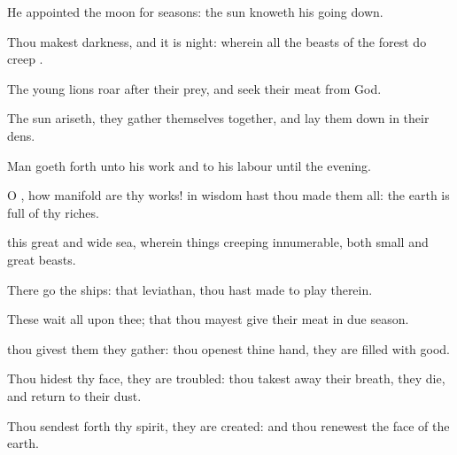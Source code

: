 {\Q {}He
appointed the
moon for
seasons: the
sun
knoweth his going
down.


\par }{\Q {}Thou
makest
darkness, and it is
night: wherein all the
beasts of the
forest do
creep
{}.


\par }{\Q {}The young
lions
roar after their
prey, and
seek their
meat from
God.


\par }{\Q {}The
sun
ariseth, they gather themselves
together, and lay them
down in their
dens.


\par }{\Q {}Man goeth
forth unto his
work and to his
labour until the
evening.


\par }{\Q {}O
{}, how
manifold are thy
works! in
wisdom hast thou
made them all: the
earth is
full of thy
riches.


\par }{\Q {} this
great and
wide
sea, wherein
{} things
creeping
innumerable, both
small and
great
beasts.


\par }{\Q {}There
go the
ships:
{} that
leviathan,
{} thou hast
made to
play therein.


\par }{\Q {}These
wait all upon thee; that thou mayest
give
{} their
meat in due
season.


\par }{\Q {} thou
givest them they
gather: thou
openest thine
hand, they are
filled with
good.


\par }{\Q {}Thou
hidest thy
face, they are
troubled: thou takest
away their
breath, they
die, and
return to their
dust.


\par }{\Q {}Thou
sendest forth thy
spirit, they are
created: and thou
renewest the
face of the
earth.


\par }{\BB \par }
